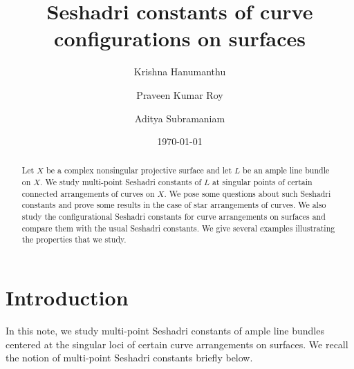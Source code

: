 \documentclass[12pt,reqno]{amsart}
\theoremstyle{plain}
\numberwithin{equation}{section}
\theoremstyle{definition}
\begin{document}
	\title[Seshadri constants  of curve configurations on surfaces]{Seshadri constants  of curve configurations on surfaces}
	\author[K. Hanumanthu]{Krishna Hanumanthu}

\address{Chennai Mathematical Institute, H1 SIPCOT IT Park, Siruseri, Kelambakkam 603103,
India.}


\author[P. K. Roy]{Praveen Kumar Roy}

\address{UM-DAE Centre for Excellence in Basic Sciences, University of Mumbai Santacruz, Mumbai 400098, India}


\author[A. Subramaniam]{Aditya Subramaniam}

\address{Indian Institute of Science Education and Research Tirupati, Rami Reddy Nagar, Karakambadi Road, Mangalam (P.O.),
Tirupati, Andhra Pradesh, INDIA – 517507.}



\date{\today}

	\begin{abstract}
	Let $X$ be a complex nonsingular projective surface and let $L$ be an ample line bundle on $X$. We study multi-point Seshadri constants of $L$ at singular points of certain connected arrangements of curves on $X$. We pose some questions about such Seshadri constants and prove some results in the case of star arrangements of curves. We also study the configurational Seshadri constants for curve arrangements on surfaces and compare them with the usual Seshadri constants. We give several examples illustrating the properties that we study. 
	\end{abstract}
	
		\maketitle

	
	\section{Introduction}
	In this note, we study multi-point Seshadri constants of ample line bundles centered at the singular loci of certain curve arrangements on surfaces. We recall the notion of  multi-point Seshadri constants briefly below. 
	
\end{document}
